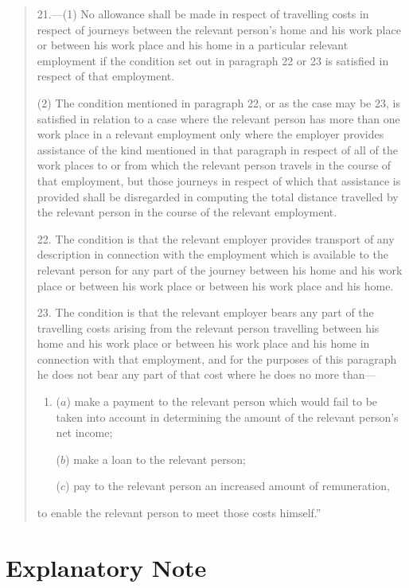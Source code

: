 \documentclass[12pt,a4paper]{article}
\begin{document}
\begin{quotation}
21.—(1) No allowance shall be made in respect of travelling costs in respect of journeys between the relevant person’s home and his work place or between his work place and his home in a particular relevant employment if the condition set out in paragraph 22 or 23 is satisfied in respect of that employment.

(2) The condition mentioned in paragraph 22, or as the case may be 23, is satisfied in relation to a case where the relevant person has more than one work place in a relevant employment only where the employer provides assistance of the kind mentioned in that paragraph in respect of all of the work places to or from which the relevant person travels in the course of that employment, but those journeys in respect of which that assistance is provided shall be disregarded in computing the total distance travelled by the relevant person in the course of the relevant employment.

\medskip

22.  The condition is that the relevant employer provides transport of any description in connection with the employment which is available to the relevant person for any part of the journey between his home and his work place or between his work place or between his work place and his home.

\medskip

23.  The condition is that the relevant employer bears any part of the travelling costs arising from the relevant person travelling between his home and his work place or between his work place and his home in connection with that employment, and for the purposes of this paragraph he does not bear any part of that cost where he does no more than—
\begin{enumerate}\item[]
($a$) make a payment to the relevant person which would fail to be taken into account in determining the amount of the relevant person’s net income;

($b$) make a loan to the relevant person;

($c$) pay to the relevant person an increased amount of remuneration,
\end{enumerate}
to enable the relevant person to meet those costs himself.''
\end{quotation}

\part{Explanatory Note}
\end{document}
